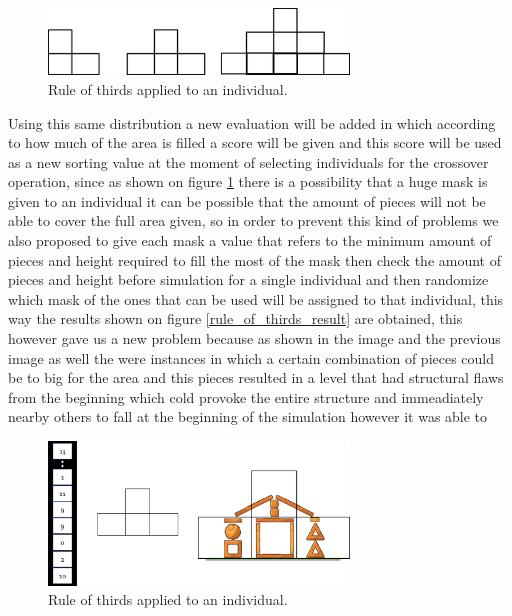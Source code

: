 \documentclass[conference]{IEEEtran}
\begin{document}
\begin{figure}[htbp]
    \centerline{\includegraphics[width=80mm]{Images/mask_distribution.png}}
    \caption{Rule of thirds applied to an individual.}
    \label{rule_of_thirds_masks}
\end{figure}

Using this same distribution a new evaluation will be added in which according to how much of the area is filled a score will be given and this score will be used as a new sorting value at the moment of selecting individuals for the crossover operation, since as shown on figure \ref{rule_of_thirds_masks} there is a possibility that a huge mask is given to an individual it can be possible that the amount of pieces will not be able to cover the full area given, so in order to prevent this kind of problems we also proposed to give each mask a value that refers to the minimum amount of pieces and height required to fill the most of the mask then check the amount of pieces and height before simulation for a single individual and then randomize which mask of the ones that can be used will be assigned to that individual, this way the results shown on figure \ref{rule_of_thirds_result} are obtained, this however gave us a new problem because as shown in the image and the previous image as well the were instances in which a certain combination of pieces could be to big for the area and this pieces resulted in a level that had structural flaws from the beginning which cold provoke the entire structure and immeadiately nearby others to fall at the beginning of the simulation however it was able to 

\begin{figure}[htbp]
    \centerline{\includegraphics[width=80mm]{Images/chromosome_thirds.png}}
    \caption{Rule of thirds applied to an individual.}
    \label{rule_of_thirds_applied}
\end{figure}
\end{document}
